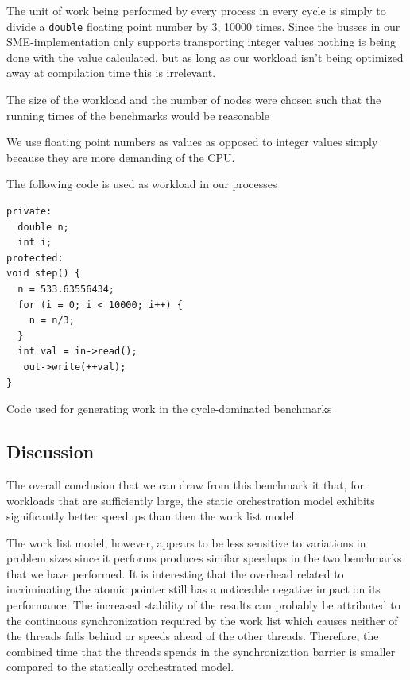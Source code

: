 The unit of work being performed by every process in every cycle is
simply to divide a \texttt{double} floating point number by 3, 10000
times. Since the busses in our SME-implementation only supports
transporting integer values nothing is being done with the value calculated,
but as long as our workload isn't being optimized away at compilation
time this is irrelevant.

The size of the workload and the number of nodes were chosen such that
the running times of the benchmarks would be reasonable 

We use floating point numbers as values as opposed to integer values
simply because they are more demanding of the CPU.

The following code is used as workload in our processes

\begin{listing}[H]
\begin{verbatim}
private:
  double n;
  int i;
protected:
void step() {
  n = 533.63556434;
  for (i = 0; i < 10000; i++) {
    n = n/3;
  }
  int val = in->read();
   out->write(++val);
}
\end{verbatim}
\caption{Code used for generating work in the cycle-dominated
  benchmarks}
\label{lst:cyclecode}
\end{listing}


\subsection{Discussion}
The overall conclusion that we can draw from this benchmark it that,
for workloads that are sufficiently large, the static orchestration
model exhibits significantly better speedups than then the work list
model.

The work list model, however, appears to be less sensitive to
variations in problem sizes since it performs produces similar
speedups in the two benchmarks that we have performed. It is
interesting that the overhead related to incriminating the atomic
pointer still has a noticeable negative impact on its performance. The
increased stability of the results can probably be attributed to the
continuous synchronization required by the work list which causes
neither of the threads falls behind or speeds ahead of the other
threads. Therefore, the combined time that the threads spends in the
synchronization barrier is smaller compared to the statically
orchestrated model.



